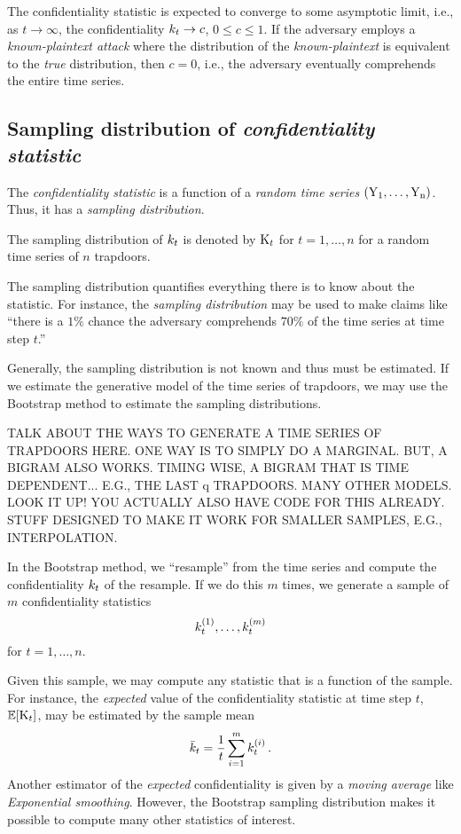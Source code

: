 \documentclass[ ../main.tex]{subfiles}
\begin{document}
The confidentiality statistic is expected to converge to some asymptotic limit, i.e., as $t \to \infty$, the confidentiality $k_t \to c$, $0 \leq c \leq 1$. If the adversary employs a \emph{known-plaintext attack} where the distribution of the \emph{known-plaintext} is equivalent to the \emph{true} distribution, then $c = 0$, i.e., the adversary eventually comprehends the entire time series.

\subsection{Sampling distribution of \emph{confidentiality statistic}}
The \emph{confidentiality statistic} is a function of a \emph{random time series} $\left(\mathrm{Y_1},\ldots,\mathrm{Y_n}\right)$. Thus, it has a \emph{sampling distribution}.
\begin{definition}
The sampling distribution of $k_t$ is denoted by $\mathrm{K}_t$ for $t = 1,\ldots,n$ for a random time series of $n$ trapdoors.
\end{definition}
The sampling distribution quantifies everything there is to know about the statistic. For instance, the \emph{sampling distribution} may be used to make claims like ``there is a $1\%$ chance the adversary comprehends $70\%$ of the time series at time step $t$.''  

Generally, the sampling distribution is not known and thus must be estimated. If we estimate the generative model of the time series of trapdoors, we may use the Bootstrap method\cite{ref16} to estimate the sampling distributions.

TALK ABOUT THE WAYS TO GENERATE A TIME SERIES OF TRAPDOORS HERE. ONE WAY IS TO SIMPLY DO A MARGINAL. BUT, A BIGRAM ALSO WORKS. TIMING WISE, A BIGRAM THAT IS TIME DEPENDENT... E.G., THE LAST q TRAPDOORS. MANY OTHER MODELS. LOOK IT UP! YOU ACTUALLY ALSO HAVE CODE FOR THIS ALREADY. STUFF DESIGNED TO MAKE IT WORK FOR SMALLER SAMPLES, E.G., INTERPOLATION.

In the Bootstrap method, we ``resample'' from the time series and compute the confidentiality $k_t$ of the resample. If we do this $m$ times, we generate a sample of $m$ confidentiality statistics
\begin{equation}
    k_t^{(1)},\ldots,k_t^{(m)}
\end{equation}
for $t=1,\ldots,n$.

Given this sample, we may compute any statistic that is a function of the sample. For instance, the \emph{expected} value of the confidentiality statistic at time step $t$, $\operatorname{\mathbb{E}}[\mathrm{K}_t]$, may be estimated by the sample mean
\begin{equation}
    \bar{k}_t = \frac{1}{t} \sum_{i=1}^{m} k_t^{(i)}\,.
\end{equation}
Another estimator of the \emph{expected} confidentiality is given by a \emph{moving average} like \emph{Exponential smoothing}. However, the Bootstrap sampling distribution makes it possible to compute many other statistics of interest.
\end{document}
